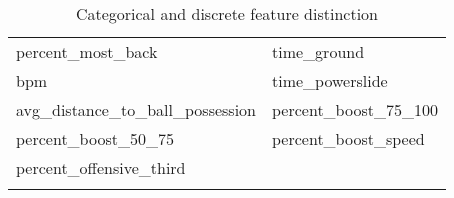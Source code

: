 \begin{longtable}{p{} p{}}
percent\_most\_back                     & time\_ground                            \\
bpm                                     & time\_powerslide                        \\
avg\_distance\_to\_ball\_possession     & percent\_boost\_75\_100                 \\
percent\_boost\_50\_75                  & percent\_boost\_speed                   \\
percent\_offensive\_third               & \\
\bottomrule
\caption{Categorical and discrete feature distinction}
\label{tab:catdiscr}             
\end{longtable}
